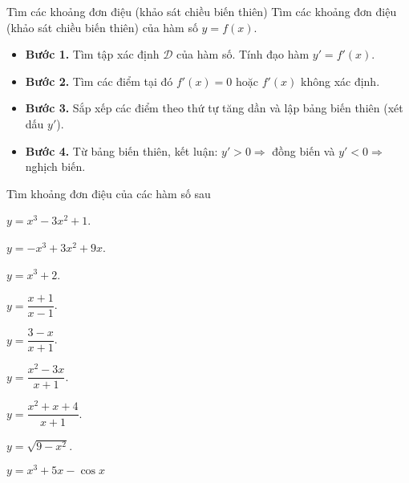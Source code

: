 \begin{dang}{Tìm các khoảng đơn điệu (khảo sát chiều biến thiên)}
 \baitoan Tìm các khoảng đơn điệu (khảo sát chiều biến thiên) của hàm số $y=f(x)$.\\
 \phuongphap
 \begin{itemize}
 \item \textbf{Bước 1.} Tìm tập xác định $\mathscr{D}$ của hàm số. Tính đạo hàm $y'=f'(x)$.
 \item \textbf{Bước 2.} Tìm các điểm tại đó $f'(x)=0$ hoặc $f'(x)$ không xác định.
 \item \textbf{Bước 3.} Sắp xếp các điểm theo thứ tự tăng dần và lập bảng biến thiên (xét dấu $y'$).
 \item \textbf{Bước 4.} Từ bảng biến thiên, kết luận: $y'>0 \Rightarrow $ đồng biến và $y'<0 \Rightarrow $ nghịch biến.
 \end{itemize}
\end{dang}
\begin{vd}%
 Tìm khoảng đơn điệu của các hàm số sau
 \begin{listEX}[3]
 \item $y=x^3-3x^2+1$.
 \item $y=-x^3+3x^2+9x$.
 \item $y=x^3+2$.
 \item $y=\dfrac{x+1}{x-1}$.
 \item $y=\dfrac{3-x}{x+1}$.
 \item $y=\dfrac{x^2-3x}{x+1}$.
 \item $y=\dfrac{x^2+x+4}{x+1}$.
 \item $y=\sqrt{9-x^2}$.
 \item $y=x^3+5x-\cos x$
 \end{listEX}
 \loigiai{}
\end{vd}
